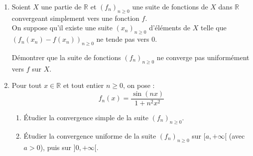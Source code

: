 \documentclass[a4paper,twoside,french,11pt]{VcCours}
\begin{document}
\begin{Exercice}{} \begin{enumerate}
\item Soient $X$ une partie de $\mathbb{R}$ et $\left( f_{n}\right) _{n \geq 0}$ une suite de fonctions de $X$ dans $\mathbb{R}$ convergeant simplement vers une fonction $f$. \\
On suppose qu'il existe une suite $\left( x_{n}\right)_{n \geq 0}$ d'éléments de $X$ telle que $\left( f_{n}(x_{n})-f\left( x_{n}\right) \right) _{n \geq 0}$ ne tende pas vers $0$. \medskip

Démontrer que la suite de fonctions $\left( f_{n}\right) _{n \geq 0}$ ne converge pas uniformément vers $f$ sur $X$.

\item Pour tout $x\in\mathbb{R}$ et tout entier $n \geq 0$, on pose :
$$f_{n}(x) =\dfrac{\sin \left( nx\right) }{1+n^{2}x^{2}}$$
	\begin{enumerate}
	\item Étudier la convergence simple de la suite $\left( f_{n}\right)_{n \geq 0}$.
	\item Étudier la convergence uniforme de la suite $\left( f_{n}\right)_{n \geq 0}$ sur $[a,+\infty[$ (avec $a>0$),  puis sur $]0,+\infty[$.
	\end{enumerate}
\end{enumerate}
\end{Exercice}

\newpage
\end{document}
